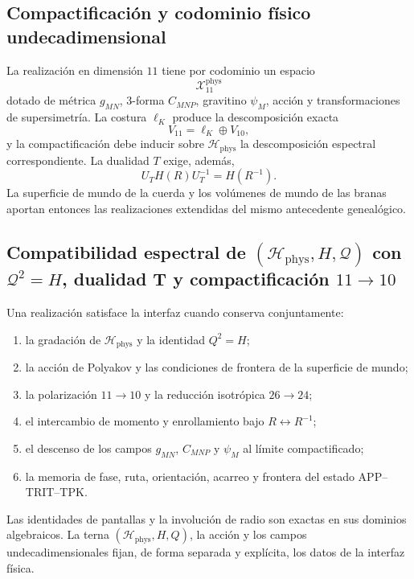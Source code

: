 \subsection{Compactificación y codominio físico undecadimensional}

La realización en dimensión \(11\) tiene por codominio un espacio
\[
 \mathcal X_{11}^{\mathrm{phys}}
\]
dotado de métrica \(g_{MN}\), \(3\)-forma \(C_{MNP}\), gravitino
\(\psi_M\), acción y transformaciones de supersimetría. La costura
\(\ell_K\) produce la descomposición exacta
\[
 V_{11}=\ell_K\oplus V_{10},
\]
y la compactificación debe inducir sobre
\(\mathcal H_{\mathrm{phys}}\) la descomposición espectral correspondiente.
La dualidad \(T\) exige, además,
\[
 U_T H(R)U_T^{-1}=H(R^{-1}).
\]
La superficie de mundo de la cuerda y los volúmenes de mundo de las branas
aportan entonces las realizaciones extendidas del mismo antecedente
genealógico.

\subsection{Compatibilidad espectral de \((\mathcal H_{\mathrm{phys}},H,\mathcal Q)\) con \(\mathcal Q^2=H\), dualidad T y compactificación \(11\to10\)}

Una realización satisface la interfaz cuando conserva conjuntamente:
\begin{enumerate}
\item la gradación de \(\mathcal H_{\mathrm{phys}}\) y la identidad
      \(Q^2=H\);
\item la acción de Polyakov y las condiciones de frontera de la superficie
      de mundo;
\item la polarización \(11\to10\) y la reducción isotrópica \(26\to24\);
\item el intercambio de momento y enrollamiento bajo \(R\leftrightarrow
      R^{-1}\);
\item el descenso de los campos \(g_{MN}\), \(C_{MNP}\) y \(\psi_M\) al
      límite compactificado;
\item la memoria de fase, ruta, orientación, acarreo y frontera del estado
      APP--TRIT--TPK.
\end{enumerate}
Las identidades de pantallas y la involución de radio son exactas en sus
dominios algebraicos. La terna
\((\mathcal H_{\mathrm{phys}},H,Q)\), la acción y los campos
undecadimensionales fijan, de forma separada y explícita, los datos de la
interfaz física.
